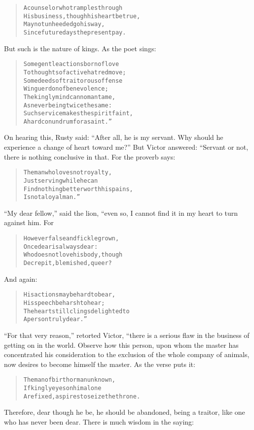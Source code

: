 \documentclass[article, twoside, 14pt]{memoir}
\renewenvironment{verbatim}{%
\begin{quote}%
\vskip -10pt%
\begin{alltt}\normalfont\large}{\end{alltt}%
\end{quote}%
\vskip -10pt
} %
\begin{document}
\begin{verbatim}
A counselor who tramples through
His business, though his heart be true,
May not unheeded go his way,
Since future days the present pay.
\end{verbatim}
But such is the nature of kings. As the poet sings:

\begin{verbatim}
Some gentle actions born of love
To thoughts of active hatred move;
Some deeds of traitorous offense
Win guerdon of benevolence;
The kingly mind can no man tame,
As never being twice the same:
Such service makes the spirit faint,
A hard conundrum for a saint.”
\end{verbatim}
On hearing this, Rusty said:
``After all, he is my servant. Why should he experience a change of heart toward me?''
But Victor answered: “Servant or not, there is nothing conclusive
in that. For the proverb says:

\begin{verbatim}
The man who loves not royalty,
    Just serving while he can
Find nothing better worth his pains,
    Is not a loyal man.”
\end{verbatim}
``My dear fellow,'' said the lion, “even so, I cannot find it in my
heart to turn against him. For

\begin{verbatim}
However false and fickle grown,
    Once dear is always dear:
Who does not love his body, though
    Decrepit, blemished, queer?
\end{verbatim}
And again:

\begin{verbatim}
His actions may be hard to bear,
    His speech be harsh to hear;
The heart still clings delighted to
    A person truly dear.”
\end{verbatim}
``For that very reason,'' retorted Victor, “there is a serious flaw
in the business of getting on in the world. Observe how this
person, upon whom the master has concentrated his consideration to
the exclusion of the whole company of animals, now desires to
become himself the master. As the verse puts it:

\begin{verbatim}
The man of birth or man unknown,
If kingly eyes on him alone
Are fixed, aspires to seize the throne.
\end{verbatim}
Therefore, dear though he be, he should be abandoned, being a
traitor, like one who has never been dear. There is much wisdom in
the saying:
\end{document}
